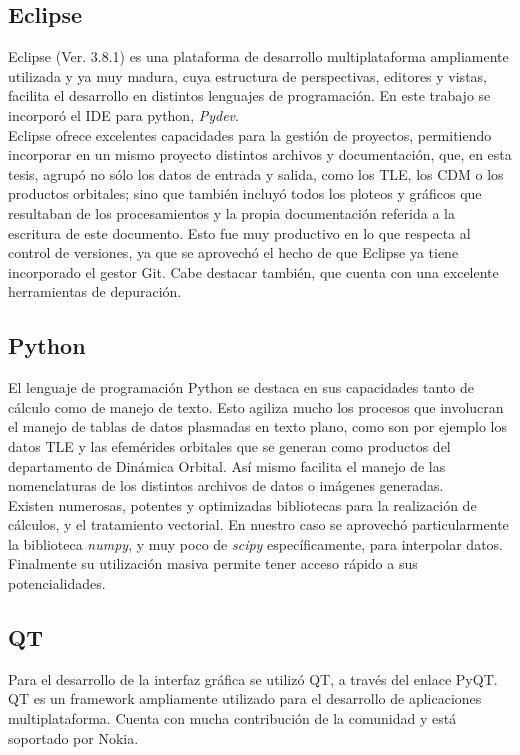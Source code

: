 \subsection*{Eclipse}
Eclipse (Ver. 3.8.1) es una plataforma de desarrollo multiplataforma ampliamente utilizada y ya muy madura, cuya estructura de perspectivas, editores y vistas, facilita el desarrollo en distintos lenguajes de programaci\'on. En este trabajo se incorpor\'o el IDE para python, {\it{Pydev}}.\\

Eclipse ofrece excelentes capacidades para la gesti\'on de proyectos, permitiendo incorporar en un mismo proyecto distintos archivos y documentaci\'on, que, en esta tesis, agrup\'o no s\'olo los datos de entrada y salida, como los TLE, los CDM o los productos orbitales; sino que tambi\'en incluy\'o todos los ploteos y gr\'aficos que resultaban de los procesamientos y la propia documentaci\'on referida a la escritura de este documento. Esto fue muy productivo en lo que respecta al control de versiones, ya que se aprovech\'o el hecho de que Eclipse ya tiene incorporado el gestor Git.
Cabe destacar también, que cuenta con una excelente herramientas de depuraci\'on.\\

\subsection*{Python}
El lenguaje de programaci\'on Python se destaca en sus capacidades tanto de c\'alculo como de manejo de texto. Esto agiliza mucho los procesos que involucran el manejo de tablas de datos plasmadas en texto plano, como son por ejemplo los datos TLE y las efem\'erides orbitales que se generan como productos del departamento de Din\'amica Orbital. As\'i mismo facilita el manejo de las nomenclaturas de los distintos archivos de datos o im\'agenes generadas.\\

Existen numerosas, potentes y optimizadas bibliotecas para la realizaci\'on de c\'alculos, y el tratamiento vectorial. En nuestro caso se aprovech\'o particularmente la biblioteca {\it{numpy}}, y muy poco de {\it{scipy}} espec\'ificamente, para interpolar datos.
Finalmente su utilizaci\'on masiva permite tener acceso r\'apido a sus potencialidades.\\

\subsection*{QT}
Para el desarrollo de la interfaz gr\'afica se utiliz\'o QT, a trav\'es del enlace PyQT.\\
QT es un framework ampliamente utilizado para el desarrollo de aplicaciones multiplataforma. Cuenta con mucha contribuci\'on de la comunidad y est\'a soportado por Nokia.\\


